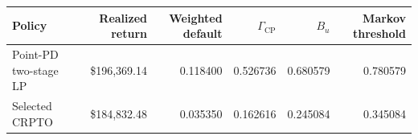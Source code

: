 \begin{tabular}{lrrrrr}
\toprule
Policy & Realized return & Weighted default & $\Gamma_{\mathrm{CP}}$ & $B_u$ & Markov threshold \\
\midrule
Point-PD two-stage LP & \$196,369.14 & 0.118400 & 0.526736 & 0.680579 & 0.780579 \\
Selected CRPTO & \$184,832.48 & 0.035350 & 0.162616 & 0.245084 & 0.345084 \\
\bottomrule
\end{tabular}
